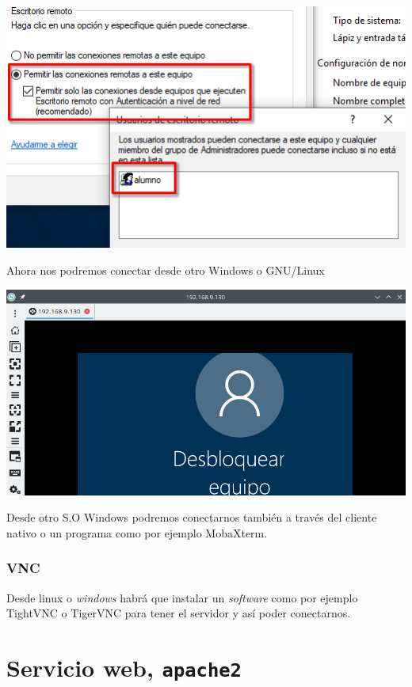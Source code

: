 \documentclass[11pt]{article}
\begin{document}
\begin{center}
\includegraphics[width=.9\linewidth]{./media/rdp-1.png}
\end{center}

Ahora nos podremos conectar desde otro Windows o GNU/Linux

\begin{center}
\includegraphics[width=.9\linewidth]{./media/rdp-2.png}
\end{center}

Desde otro S.O Windows podremos conectarnos también a través del cliente nativo o un programa como por ejemplo MobaXterm.
\subsubsection{VNC}
\label{sec:orgd5bef28}
Desde linux o \emph{windows} habrá que instalar un \emph{software} como por ejemplo TightVNC o TigerVNC para tener el servidor y así poder conectarnos.

\section{Servicio web, \texttt{apache2}}
\label{sec:org68e17ad}
\end{document}
